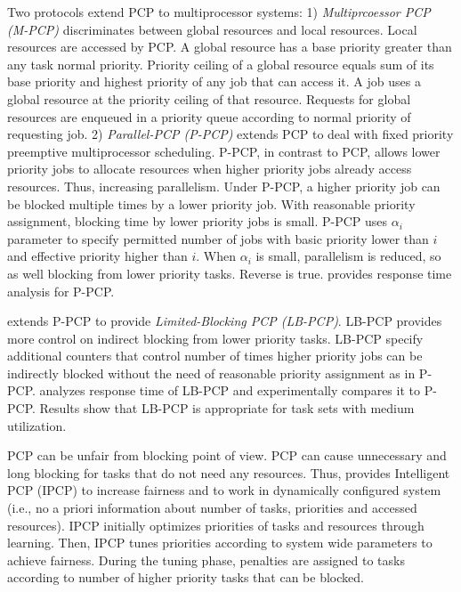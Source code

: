 \documentclass[12pt,english]{report}
\begin{document}
Two protocols extend PCP to multiprocessor systems: 1) \textit{Multiprcoessor
PCP (M-PCP)} \cite{Rajkumar:1991:SRS:532621,lakshmanan2009coordinated,rajkumar2002real}
discriminates between global resources and local resources. Local
resources are accessed by PCP. A global resource has a base priority
greater than any task normal priority. Priority ceiling of a global
resource equals sum of its base priority and highest priority of any
job that can access it. A job uses a global resource at the priority
ceiling of that resource. Requests for global resources are enqueued
in a priority queue according to normal priority of requesting job.
2) \textit{Parallel-PCP (P-PCP)} \cite{easwaran2009resource} extends
PCP to deal with fixed priority preemptive multiprocessor scheduling.
P-PCP, in contrast to PCP, allows lower priority jobs to allocate
resources when higher priority jobs already access resources. Thus,
increasing parallelism. Under P-PCP, a higher priority job can be
blocked multiple times by a lower priority job. With reasonable priority
assignment, blocking time by lower priority jobs is small. P-PCP uses
$\alpha_{i}$ parameter to specify permitted number of jobs with basic
priority lower than $i$ and effective priority higher than $i$.
When $\alpha_{i}$ is small, parallelism is reduced, so as well blocking
from lower priority tasks. Reverse is true. \cite{easwaran2009resource}
provides response time analysis for P-PCP.

\cite{6001645} extends P-PCP to provide \textit{Limited-Blocking
PCP (LB-PCP)}. LB-PCP provides more control on indirect blocking from
lower priority tasks. LB-PCP specify additional counters that control
number of times higher priority jobs can be indirectly blocked without
the need of reasonable priority assignment as in P-PCP. \cite{6001645}
analyzes response time of LB-PCP and experimentally compares it to
P-PCP. Results show that LB-PCP is appropriate for task sets with
medium utilization.

PCP can be unfair from blocking point of view. PCP can cause unnecessary
and long blocking for tasks that do not need any resources. Thus,
\cite{6031129} provides Intelligent PCP (IPCP) to increase fairness
and to work in dynamically configured system (i.e., no a priori information
about number of tasks, priorities and accessed resources). IPCP initially
optimizes priorities of tasks and resources through learning. Then,
IPCP tunes priorities according to system wide parameters to achieve
fairness. During the tuning phase, penalties are assigned to tasks
according to number of higher priority tasks that can be blocked.
\end{document}
